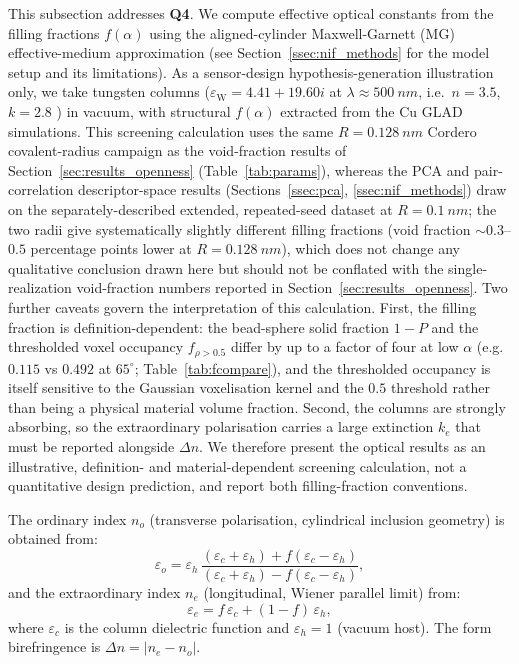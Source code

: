 \documentclass[aip,amsmath,amssymb,reprint]{revtex4-1}
\newcommand{\dang}{\ensuremath{\alpha}}
\newcommand{\bsP}{\ensuremath{P}}
\begin{document}
This subsection addresses \textbf{Q4}.
We compute effective optical constants from the filling fractions
$f(\dang)$ using the aligned-cylinder Maxwell-Garnett (MG) effective-medium
approximation \citep{maxwell1904} (see Section~\ref{ssec:nif_methods}
for the model setup and its limitations).
As a sensor-design hypothesis-generation illustration only, we take tungsten columns
($\varepsilon_{\mathrm{W}} = 4.41 + 19.60i$ at $\lambda \approx \SI{500}{nm}$,
i.e.\ $n=3.5$, $k=2.8$ \citep{palik1985}) in vacuum, with structural
$f(\dang)$ extracted from the Cu GLAD simulations.  This screening calculation uses the same $R=\SI{0.128}{nm}$ Cordero
covalent-radius \citep{cordero2008} campaign as the void-fraction results
of Section~\ref{sec:results_openness} (Table~\ref{tab:params}), whereas
the PCA and pair-correlation descriptor-space results
(Sections~\ref{ssec:pca}, \ref{ssec:nif_methods}) draw on the
separately-described extended, repeated-seed dataset at $R=\SI{0.1}{nm}$;
the two radii give systematically slightly different filling fractions
(void fraction $\sim 0.3$--$0.5$ percentage points lower at
$R=\SI{0.128}{nm}$), which does not change any qualitative conclusion
drawn here but should not be conflated with the single-realization
void-fraction numbers reported in Section~\ref{sec:results_openness}.
Two further caveats govern the interpretation of this calculation.
First, the filling fraction is definition-dependent: the bead-sphere solid
fraction $1-\bsP$ and the thresholded voxel occupancy $f_{\rho>0.5}$ differ
by up to a factor of four at low $\dang$ (e.g.\ $0.115$ vs $0.492$ at
$65^{\circ}$; Table~\ref{tab:fcompare}), and the thresholded occupancy is
itself sensitive to the Gaussian voxelisation kernel and the $0.5$ threshold
rather than being a physical material volume fraction.  Second, the columns
are strongly absorbing, so the extraordinary polarisation carries a large
extinction $k_e$ that must be reported alongside $\Delta n$.
We therefore present the optical results as an illustrative, definition- and
material-dependent screening calculation, not a quantitative design
prediction, and report both filling-fraction conventions.

The ordinary index $n_o$ (transverse polarisation,
cylindrical inclusion geometry) is obtained from:
\begin{equation}
  \varepsilon_o = \varepsilon_h\,
  \frac{(\varepsilon_c + \varepsilon_h) + f(\varepsilon_c - \varepsilon_h)}
       {(\varepsilon_c + \varepsilon_h) - f(\varepsilon_c - \varepsilon_h)},
  \label{eq:mg_transverse}
\end{equation}
and the extraordinary index $n_e$ (longitudinal, Wiener parallel limit) from:
\begin{equation}
  \varepsilon_e = f\,\varepsilon_c + (1-f)\,\varepsilon_h,
  \label{eq:mg_parallel}
\end{equation}
where $\varepsilon_c$ is the column dielectric function and
$\varepsilon_h = 1$ (vacuum host).
The form birefringence is $\Delta n = |n_e - n_o|$.
\end{document}
